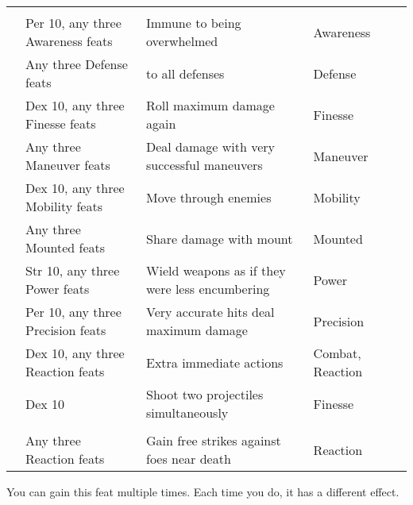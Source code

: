 \begin{longtabuwrapper}
\begin{longtabu}{>{\lcol}p{10em} >{\lcol}p{15em} >{\lcol}X >{\lcol}p{6em} >{\lcol}p{3em}}
        \midrule
         &  &  &  &  \\
         & Per 10, any three Awareness feats & Immune to being overwhelmed & Awareness &  \\
         & Any three Defense feats &  to all defenses & Defense &  \\
         & Dex 10, any three Finesse feats & Roll maximum damage again & Finesse &  \\
         & Any three Maneuver feats & Deal damage with very successful maneuvers & Maneuver &  \\
         & Dex 10, any three Mobility feats & Move through enemies & Mobility&  \\
         & Any three Mounted feats & Share damage with mount & Mounted&  \\
         & Str 10, any three Power feats & Wield weapons as if they were less encumbering & Power&  \\
         & Per 10, any three Precision feats & Very accurate hits deal maximum damage & Precision &  \\
         & Dex 10, any three Reaction feats & Extra immediate actions & Combat, Reaction &  \\
         & Dex 10 & Shoot two projectiles simultaneously & Finesse &  \\

        \midrule
         &  &  &  &  \\
         & Any three Reaction feats & Gain free strikes against foes near death & Reaction &  \\
    \end{longtabu}
    \begin{enumerate*}
        \item You can gain this feat multiple times.
            Each time you do, it has a different effect.
    \end{enumerate*}
\end{longtabuwrapper}

